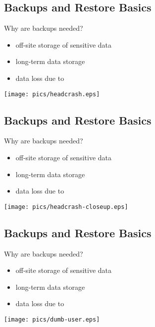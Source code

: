 \documentclass[xga]{xdvislides}
\begin{document}
\subsection{Backups and Restore Basics}
Why are backups needed?
\begin{itemize}
	\item off-site storage of sensitive data
	\item long-term data storage
	\item data loss due to
\end{itemize}
\vspace*{\fill}
\begin{center}
	\texttt{[image: pics/headcrash.eps]}
\end{center}
\vspace*{\fill}

\subsection{Backups and Restore Basics}
Why are backups needed?
\begin{itemize}
	\item off-site storage of sensitive data
	\item long-term data storage
	\item data loss due to
\end{itemize}
\vspace*{\fill}
\begin{center}
	\texttt{[image: pics/headcrash-closeup.eps]}
\end{center}
\vspace*{\fill}

\subsection{Backups and Restore Basics}
Why are backups needed?
\begin{itemize}
	\item off-site storage of sensitive data
	\item long-term data storage
	\item data loss due to
\end{itemize}
\vspace*{\fill}
\begin{center}
	\texttt{[image: pics/dumb-user.eps]}
\end{center}
\vspace*{\fill}
\end{document}
